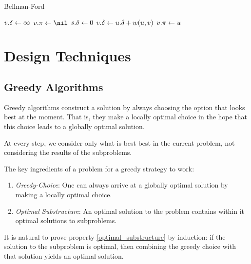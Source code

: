 \begin{algorithm}[h]
\caption{Bellman-Ford}\label{alg:bellmanford}
\begin{algorithmic}[1]
    \State $v\mathtt{.}\mathtt{\delta}\gets\infty$
    \State $\attrib{v}{\pi}\gets\nil$
  \EndFor
  \State $s\mathtt{.}\mathtt{\delta}\gets 0$
        \State $v\mathtt{.}\mathtt{\delta}\gets u\mathtt{.}\mathtt{\delta}+w(u,v)$ 
        \State $v\mathtt{.}\mathtt{\pi}\gets u$
      \EndIf
    \EndFor
  \EndFor
      \State \Return \fals {}
    \EndIf
  \EndFor
  \State \Return \tru
\EndFunction
\end{algorithmic}
\end{algorithm}






\section{Design Techniques}\label{sec:design_techniques}

\subsection{Greedy Algorithms}\label{sec:greedy_algorithms}

Greedy algorithms construct a solution by always choosing the option that looks best at the moment.
That is, they make a locally optimal choice in the hope that this choice leads to a globally optimal solution.

At every step, we consider only what is best best in the current problem, not considering the results of the subproblems.


The key ingredients of a problem for a greedy strategy to work:
\begin{enumerate}
  \item \emph{Greedy-Choice}: \label{greedy_choice_property}
  One can always arrive at a globally optimal solution by making a locally optimal choice.
  \item \emph{Optimal Substructure}:  \label{optimal_substructure}
  An optimal solution to the problem contains within it optimal solutions to subproblems.
\end{enumerate}
It is natural to prove property \ref{optimal_substructure} by induction: 
if the solution to the subproblem is optimal, then combining the greedy choice with that solution yields an optimal solution.


